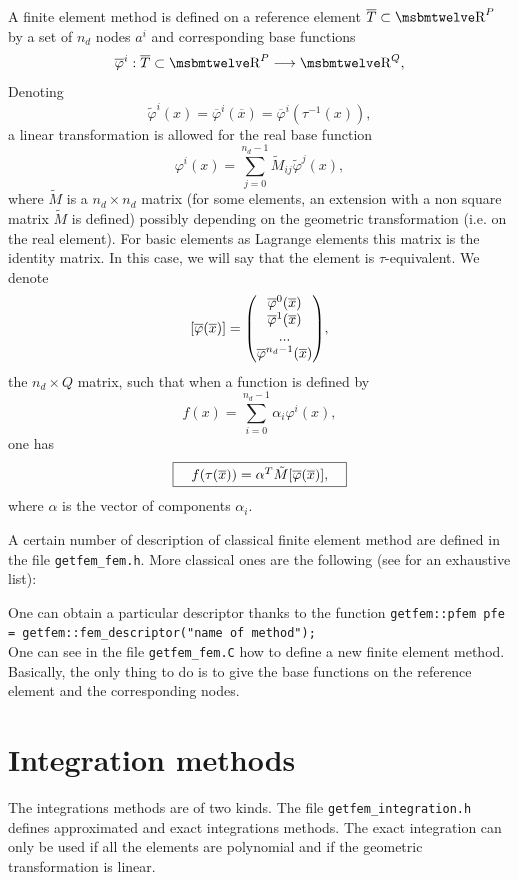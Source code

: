 \documentclass[11pt,a4paper]{article}
\begin{document}
A finite element method is defined on a reference element $\overline{T} \subset \Reel^P$ by a set of $n_d$ nodes $a^i$ and corresponding base functions 
$$ \overline{\varphi}^i : \overline{T} \subset \Reel^P \longrightarrow \Reel^Q, $$
Denoting
$$ \tilde{\varphi}^i(x) = \overline{\varphi}^i(\overline{x}) = \overline{\varphi}^i(\tau^{-1}(x)), $$
a linear transformation is allowed for the real base function
$$ \varphi^i(x) = \sum_{j = 0}^{n_d - 1} \tilde{M}_{ij} \tilde{\varphi}^j(x), $$
where $\tilde{M}$ is a $n_d \times n_d$ matrix (for some elements, an extension with a non square matrix $\tilde{M}$ is defined) possibly depending on the geometric transformation (i.e. on the real element). For basic elements as Lagrange elements this matrix is the identity matrix. In this case, we will say that the element is $\tau$-equivalent.
We denote
$$ [\overline{\varphi}(\overline{x})] = {\left(\hspace{-.5em}\begin{array}{c} {\overline{\varphi}^0(\overline{x})} \\ {\overline{\varphi}^1(\overline{x})} \\ {...} \\ {\overline{\varphi}^{n_d-1}(\overline{x})} \end{array}\hspace{-.5em}\right)}, $$
the $n_d \times Q$ matrix, such that when a function is defined by
$$ f(x) = \sum_{i = 0}^{n_d - 1} \alpha_i \varphi^i(x), $$
one has
$$ \fbox{$\hspace{1em} f(\tau(\overline{x})) = \alpha^T \tilde{M} [\overline{\varphi}(\overline{x})],\hspace{1em}$} $$
where $\alpha$ is the vector of components $\alpha_i$.

A certain number of description of classical finite element method are defined in the file {\tt getfem\_fem.h}. More classical ones are the following (see \cite{FEM_LIST} for an exhaustive list):


One can obtain a particular descriptor thanks to the function
{\tt getfem::pfem pfe = getfem::fem\_descriptor("name of method"); }\\[0.5cm]
One can see in the file {\tt getfem\_fem.C} how to define a new finite element method. Basically, the only thing to do is to give the base functions on the reference element and the corresponding nodes.

\section{Integration methods}

The integrations methods are of two kinds. The file {\tt getfem\_integration.h} defines approximated and exact integrations methods. The exact integration can only be used if all the elements are polynomial and if the geometric transformation is linear.
\end{document}
